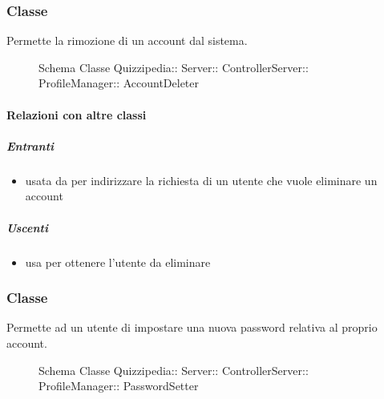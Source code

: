 \subsubsection{Classe }
Permette la rimozione di un account dal sistema.
\begin{figure}[H]
\centering
\noindent{}
\caption[Schema Classe AccountDeleter]{Schema Classe Quizzipedia:: Server:: ControllerServer:: ProfileManager:: AccountDeleter}
\end{figure}
\paragraph{Relazioni con altre classi}
\subparagraph{Entranti}
\begin{itemize}
\item usata da  per indirizzare la richiesta di un utente che vuole eliminare un account
\end{itemize}
\subparagraph{Uscenti}
\begin{itemize}
\item usa  per ottenere l'utente da eliminare
\end{itemize}
\subsubsection{Classe }
Permette ad un utente di impostare una nuova password relativa al proprio account.
\begin{figure}[H]
\centering
\noindent{}
\caption[Schema Classe PasswordSetter]{Schema Classe Quizzipedia:: Server:: ControllerServer:: ProfileManager:: PasswordSetter}
\end{figure}
